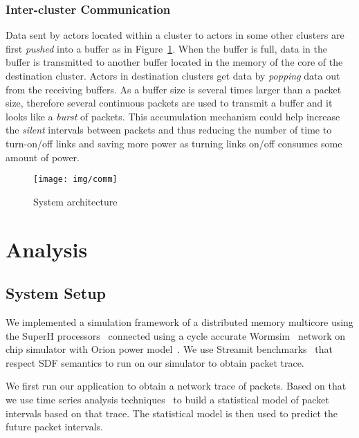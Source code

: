 \documentclass[12pt]{article}
\begin{document}
\subsubsection{Inter-cluster Communication}\label{sec:cluster_comm}
Data sent by actors located within a cluster to actors in some other
clusters are first \textit{pushed} into a buffer as in Figure~\ref{fig:comm}.
When the buffer is full, data in the buffer is transmitted to another buffer
located in the memory of the core of the destination cluster. Actors in
destination clusters get data by \textit{popping} data out from the receiving
buffers. As a buffer size is several times larger than a packet size,  therefore
several continuous packets are used to transmit a buffer and it looks like a
\textit{burst} of packets. This accumulation mechanism could help increase the \textit{silent} intervals between packets and thus reducing the number of time to turn-on/off links and saving more power as turning links on/off consumes some amount of power.


\begin{figure}[ht!]
\centering
\texttt{[image: img/comm]}
\caption{System architecture}\label{fig:comm}
\end{figure}

\section{Analysis}
\subsection{System Setup}
We implemented a simulation framework of a distributed memory multicore using
the SuperH processors~\cite{Stanley-MarbellSunflower} connected using a
cycle accurate Wormsim~\cite{Wormsim} network on chip simulator with Orion power
model~\cite{WangOrion}. We use Streamit benchmarks~\cite{ThiesStreamIt} that
respect SDF semantics to run on our simulator to obtain packet trace.

We first run our application to obtain a
network trace of packets. Based on that we use time series analysis
techniques~\cite{BrillingerTimeSeries, ShumwayTimeSeries} to build a statistical
model of packet intervals based on that trace. The statistical model is then
used to predict the future packet intervals.
\end{document}
